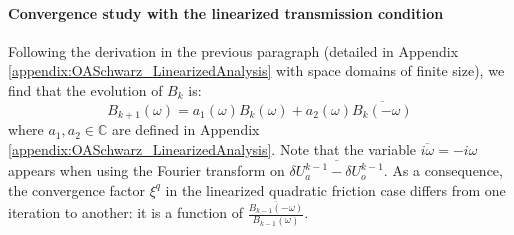 \paragraph{Convergence study with the linearized transmission condition}
Following the derivation in the previous paragraph (detailed in
Appendix \ref{appendix:OASchwarz_LinearizedAnalysis} with
space domains of finite size),
we find that the evolution of $B_k$ is:
\begin{equation}
	\label{eq:OASchwarz_ConvergenceAnalysis_linearizedCV}
	B_{k+1}(\omega) = a_1(\omega) B_{k}(\omega) + a_2(\omega)
		\overline{B_{k}(-{\omega})}
\end{equation}
where $a_1, a_2 \in \mathbb{C}$ are defined in
Appendix \ref{appendix:OASchwarz_LinearizedAnalysis}.
Note that the variable $\overline{i \omega}=-i\omega$ appears when using the Fourier
transform on $\overline{\delta U_a^{k-1} - \delta U_o^{k-1}}$.
As a consequence,
the convergence factor $\xi^q$ in the linearized 
quadratic friction case differs from one iteration to another:
it is a function of
$\frac{\overline{B_{k-1}(-\omega)}}{B_{k-1}(\omega)}$.
